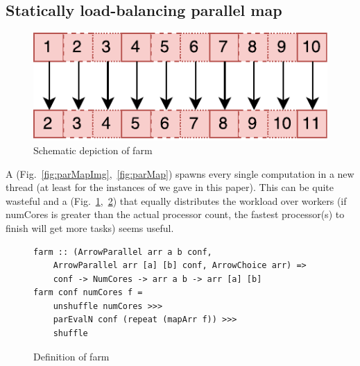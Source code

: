 \subsection{Statically load-balancing parallel map}
\begin{figure}[h]
	\includegraphics[scale=0.7]{images/farm}
	\caption{Schematic depiction of farm}
	\label{fig:farmImg}
\end{figure}
A  (Fig.~\ref{fig:parMapImg},~\ref{fig:parMap}) spawns every single computation in a new thread (at least for the instances of  we gave in this paper). This can be quite wasteful and a  (Fig.~\ref{fig:farmImg},~\ref{fig:farm}) that equally distributes the workload over  workers (if numCores is greater than the actual processor count, the fastest processor(s) to finish will get more tasks) seems useful.
\begin{figure}[h]
\begin{lstlisting}[frame=htrbl]
farm :: (ArrowParallel arr a b conf,
	ArrowParallel arr [a] [b] conf, ArrowChoice arr) =>
	conf -> NumCores -> arr a b -> arr [a] [b]
farm conf numCores f =
	unshuffle numCores >>>
	parEvalN conf (repeat (mapArr f)) >>>
	shuffle
\end{lstlisting}
\caption{Definition of farm}
\label{fig:farm}
\end{figure}

